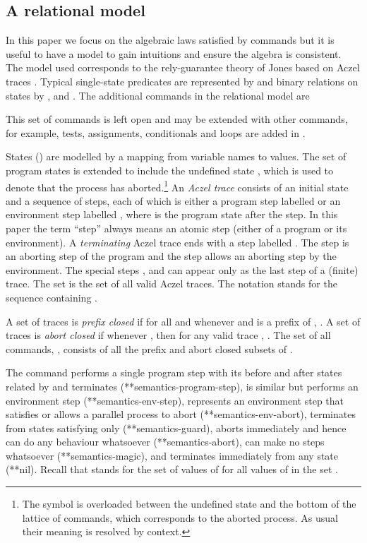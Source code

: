 \documentclass[fleqn]{fac}
\makeatletter
\def\refproperty{\@ifnextchar*{\@refproperty}{\@@refproperty}}
\def\@refproperty*#1{\ref{property-#1}\index{Property!#1|LawUse}}
\def\@@refproperty#1{property~(\ref{property-#1})\index{Property!#1|LawUse}}
\makeatother
\begin{document}
\begin{definitionx}[iteration]
\begin{lemmax}[induction]
\subsection{A relational model}\label{section:relational-model}


In this paper we focus on the algebraic laws satisfied by commands 
but it is useful to have a model to gain intuitions and ensure the algebra 
is consistent.
The model used corresponds to the rely-guarantee theory of Jones based on 
Aczel traces \cite{Aczel83,BoerHannemanDeRoever99,DeRoever01,HayesJonesColvin14TR}.
Typical
single-state predicates are represented by 
and
binary relations on states by ,  and .
The additional commands in the relational model are 

This set of commands is left open and may be extended with other commands,
for example, tests, assignments, conditionals and loops are added in \cite{HayesJonesColvin14TR}.

States () are modelled by a mapping from variable names to values.
The set of program states  is extended to include the undefined state ,
which is used to denote that the process has aborted.\footnote{The symbol  is overloaded between the undefined state and 
the bottom of the lattice of commands, which corresponds to the aborted process.
As usual their meaning is resolved by context.}
An \emph{Aczel trace} consists of an initial state  and a sequence of steps,
each of which is either a program step labelled  
or an environment step labelled ,
where  is the program state after the step.
In this paper the term ``step'' always means an atomic step
(either of a program or its environment).
A \emph{terminating} Aczel trace ends with a step labelled .
The step  is an aborting step of the program and
the step  allows an aborting step by the environment.
The special steps ,  and  can appear only as 
the last step of a (finite) trace.
The set  is the set of all valid Aczel traces.
The notation  stands for the sequence containing .

A set of traces  is \emph{prefix closed} if  for all 
and whenever  and  is a prefix of , .
A set of traces  is \emph{abort closed} if whenever ,
then for any valid trace , .
The set of all commands, , consists of all the prefix and abort closed subsets of . 

The command
 performs a single program step with its before and after states related by  and terminates (\refproperty*{semantics-program-step}),
 is similar but performs an environment step (\refproperty*{semantics-env-step}),
 represents an environment step that satisfies  or allows a parallel process to abort (\refproperty*{semantics-env-abort}),
 terminates from states satisfying  only (\refproperty*{semantics-guard}),
 aborts immediately and hence can do any behaviour whatsoever (\refproperty*{semantics-abort}),
 can make no steps whatsoever (\refproperty*{semantics-magic}),
and
 terminates immediately from any state (\refproperty*{nil}).
Recall that  stands for the set of values of  for all values of  in the set .\\
\begin{minipage}{0.55\textwidth}


\end{minipage}
\end{lemmax}
\end{definitionx}
\end{document}

